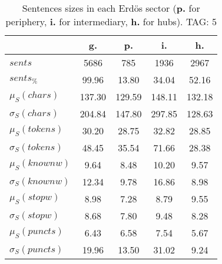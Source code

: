 \begin{table}[h!]
\begin{center}
\begin{tabular}{| l | c | c | c | c |}\hline
 & g. & p. & i. & h. \\\hline
$sents$ & 5686  & 785  & 1936  & 2967 \\\hline
$sents_{\%}$ & 99.96  & 13.80  & 34.04  & 52.16 \\\hline
$\mu_S(chars)$ & 137.30  & 129.59  & 148.11  & 132.18 \\\hline
$\sigma_S(chars)$ & 204.84  & 147.80  & 297.85  & 128.63 \\\hline
$\mu_S(tokens)$ & 30.20  & 28.75  & 32.82  & 28.85 \\\hline
$\sigma_S(tokens)$ & 48.45  & 35.54  & 71.66  & 28.38 \\\hline
$\mu_S(knownw)$ & 9.64  & 8.48  & 10.20  & 9.57 \\\hline
$\sigma_S(knownw)$ & 12.34  & 9.78  & 16.86  & 8.98 \\\hline
$\mu_S(stopw)$ & 8.98  & 7.28  & 8.79  & 9.55 \\\hline
$\sigma_S(stopw)$ & 8.68  & 7.80  & 9.48  & 8.28 \\\hline
$\mu_S(puncts)$ & 6.43  & 6.58  & 7.54  & 5.67 \\\hline
$\sigma_S(puncts)$ & 19.96  & 13.50  & 31.02  & 9.24 \\\hline
\end{tabular}
\caption{Sentences sizes in each Erd\"os sector ({{\bf p.}} for periphery, {{\bf i.}} for intermediary, {{\bf h.}} for hubs). TAG: 5}
\end{center}
\end{table}